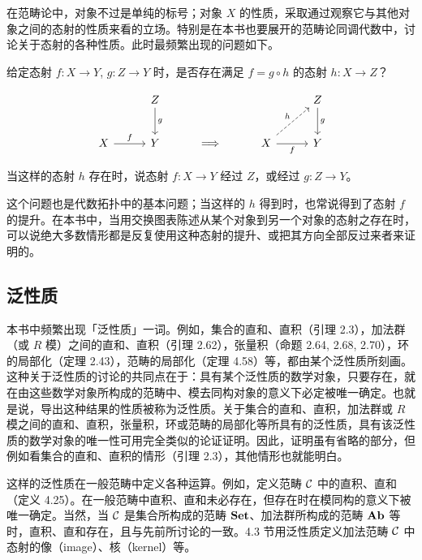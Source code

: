 在范畴论中，对象不过是单纯的标号；对象 $X$ 的性质，采取通过观察它与其他对象之间的态射的性质来看的立场。特别是在本书也要展开的范畴论同调代数中，讨论关于态射的各种性质。此时最频繁出现的问题如下。

给定态射 $f : X\to Y$, $g : Z\to Y$ 时，是否存在满足 $f=g\circ h$ 的态射 $h : X\to Z$？

\begin{center}
\[\begin{tikzcd}[row sep=2.4em, column sep=2.8em]
  & Z \arrow[d,"g"] & & & Z \arrow[d,"g"] \\
  X \arrow[r,"f"] & Y & \Longrightarrow & X \arrow[r,"f"'] \arrow[ur,dashed,"h"] & Y
\end{tikzcd}\]
\end{center}

当这样的态射 $h$ 存在时，说态射 $f : X\to Y$ 经过 $Z$，或经过 $g : Z\to Y$。

这个问题也是代数拓扑中的基本问题；当这样的 $h$ 得到时，也常说得到了态射 $f$ 的提升。在本书中，当用交换图表陈述从某个对象到另一个对象的态射之存在时，可以说绝大多数情形都是反复使用这种态射的提升、或把其方向全部反过来者来证明的。


\subsection{泛性质}

本书中频繁出现「泛性质」一词。例如，集合的直和、直积（引理 2.3），加法群（或 $R$ 模）之间的直和、直积（引理 2.62），张量积（命题 2.64, 2.68, 2.70），环的局部化（定理 2.43），范畴的局部化（定理 4.58）等，都由某个泛性质所刻画。这种关于泛性质的讨论的共同点在于：具有某个泛性质的数学对象，只要存在，就在由这些数学对象所构成的范畴中、模去同构对象的意义下必定被唯一确定。也就是说，导出这种结果的性质被称为泛性质。关于集合的直和、直积，加法群或 $R$ 模之间的直和、直积，张量积，环或范畴的局部化等所具有的泛性质，具有该泛性质的数学对象的唯一性可用完全类似的论证证明。因此，证明虽有省略的部分，但例如看集合的直和、直积的情形（引理 2.3），其他情形也就能明白。

这样的泛性质在一般范畴中定义各种运算。例如，定义范畴 $\mathcal{C}$ 中的直积、直和（定义 4.25）。在一般范畴中直积、直和未必存在，但存在时在模同构的意义下被唯一确定。当然，当 $\mathcal{C}$ 是集合所构成的范畴 $\mathbf{Set}$、加法群所构成的范畴 $\mathbf{Ab}$ 等时，直积、直和存在，且与先前所讨论的一致。4.3 节用泛性质定义加法范畴 $\mathcal{C}$ 中态射的像（image）、核（kernel）等。

